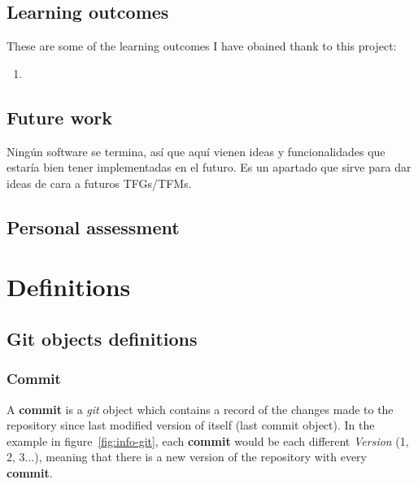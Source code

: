 \documentclass[a4paper, 12pt]{book}
\begin{document}
\section{Learning outcomes}
\label{sec:learning-outcomes}
These are some of the learning outcomes I have obained thank to this project:
\begin{enumerate}
  \item
\end{enumerate}
\section{Future work}
\label{sec:future-work}
Ningún software se termina, así que aquí vienen ideas y funcionalidades
que estaría bien tener implementadas en el futuro.
Es un apartado que sirve para dar ideas de cara a futuros TFGs/TFMs.
\section{Personal assessment}
\label{sec:assessment}
\cleardoublepage
\appendix
\chapter{Definitions}
\label{app:definitions}
\section{Git objects definitions}
\label{sec:git-definitions}
\subsection{Commit}
\label{ssec:git-commit}
A \textbf{commit} is a \emph{git} object which contains a record of the changes made to the repository since last modified
version of itself (last commit object). In the example in figure~\ref{fig:info-git}, each \textbf{commit} would be each different
\textit{Version} (1, 2, 3...), meaning that there is a new version of the repository with every \textbf{commit}.
\end{document}
